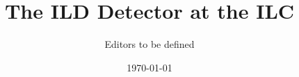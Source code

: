 \documentclass[%
 amsmath,amssymb,
 aps,
]{revtex4-1}
\begin{document}


\title{The ILD Detector at the ILC}%

\author{Editors to be defined}




\date{\today}%
\end{document}

